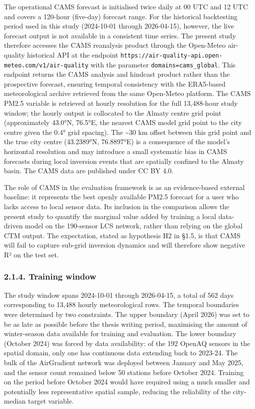 The operational CAMS forecast is initialised twice daily at 00 UTC and 12 UTC and covers a 120-hour (five-day) forecast range. For the historical backtesting period used in this study (2024-10-01 through 2026-04-15), however, the live forecast output is not available in a consistent time series. The present study therefore accesses the CAMS reanalysis product through the Open-Meteo air-quality historical API at the endpoint \texttt{https://air-quality-api.open-meteo.com/v1/air-quality} with the parameter \texttt{domains=cams\_global}. This endpoint returns the CAMS analysis and hindcast product rather than the prospective forecast, ensuring temporal consistency with the ERA5-based meteorological archive retrieved from the same Open-Meteo platform. The CAMS PM2.5 variable is retrieved at hourly resolution for the full 13,488-hour study window; the hourly output is collocated to the Almaty centre grid point (approximately 43.0°N, 76.5°E, the nearest CAMS model grid point to the city centre given the 0.4° grid spacing). The \textasciitilde30 km offset between this grid point and the true city centre (43.2389°N, 76.8897°E) is a consequence of the model's horizontal resolution and may introduce a small systematic bias in CAMS forecasts during local inversion events that are spatially confined to the Almaty basin. The CAMS data are published under CC BY 4.0.

The role of CAMS in the evaluation framework is as an evidence-based external baseline: it represents the best openly available PM2.5 forecast for a user who lacks access to local sensor data. Its inclusion in the comparison allows the present study to quantify the marginal value added by training a local data-driven model on the 190-sensor LCS network, rather than relying on the global CTM output. The expectation, stated as hypothesis H2 in §1.5, is that CAMS will fail to capture sub-grid inversion dynamics and will therefore show negative R² on the test set.

\subsubsection{2.1.4. Training window}\label{training-window}

The study window spans 2024-10-01 through 2026-04-15, a total of 562 days corresponding to 13,488 hourly meteorological rows. The temporal boundaries were determined by two constraints. The upper boundary (April 2026) was set to be as late as possible before the thesis writing period, maximising the amount of winter-season data available for training and evaluation. The lower boundary (October 2024) was forced by data availability: of the 192 OpenAQ sensors in the spatial domain, only one has continuous data extending back to 2023-24. The bulk of the AirGradient network was deployed between January and May 2025, and the sensor count remained below 50 stations before October 2024. Training on the period before October 2024 would have required using a much smaller and potentially less representative spatial sample, reducing the reliability of the city-median target variable.

